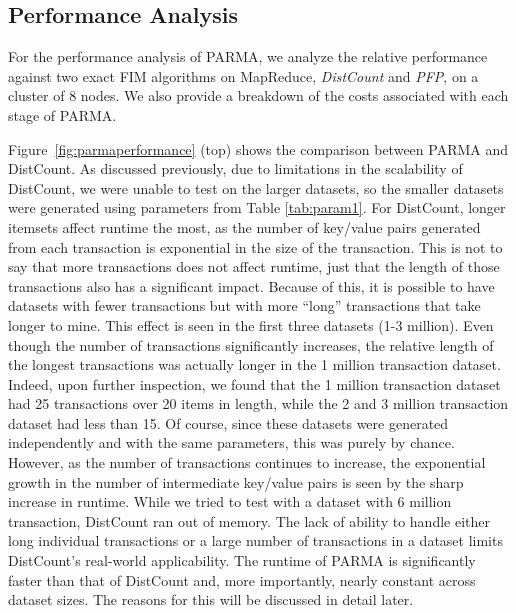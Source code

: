 \subsection{Performance Analysis} 

For the performance analysis of PARMA, we analyze the relative
performance against two exact FIM algorithms on MapReduce,
\emph{DistCount} and \emph{PFP}, on a cluster of 8 nodes. We also provide a breakdown of the costs
associated with each stage of PARMA.


Figure~\ref{fig:parmaperformance} (top) shows the comparison
between PARMA and DistCount.
As discussed previously, due to
limitations in the scalability of DistCount, we were unable to test on
the larger datasets, so the smaller datasets were generated using
parameters from Table \ref{tab:param1}. 
For DistCount,
longer itemsets affect runtime the most, as
the number of key/value pairs generated from each transaction is
exponential in the size of the transaction. This is not to say that more
transactions does not affect runtime, just that the length of those
transactions also has a significant impact. Because of this, it is
possible to have datasets with fewer transactions but with more ``long''
transactions that take longer to mine. This effect is seen in the first
three datasets (1-3 million). Even though the number of transactions
significantly increases, the relative length of the longest transactions
was actually longer in the 1 million transaction dataset. Indeed, upon
further inspection, we found that the 1 million transaction dataset had
25 transactions over 20 items in length, while the 2 and 3 million
transaction dataset had less than 15. 
Of course, since these datasets
were generated independently and with the same parameters,
this was purely by chance. However, as the number of transactions continues to
increase, the exponential growth in the number of intermediate key/value
pairs is seen by the sharp increase in runtime. While we tried to test
with a dataset with 6 million transaction, DistCount ran out of memory.
The lack of ability to handle either long individual transactions or a
large number of transactions in a dataset limits DistCount's
real-world applicability. The runtime of PARMA is significantly faster
than that of DistCount and, more importantly, nearly constant across
dataset sizes. The reasons for this will be discussed in detail later.


